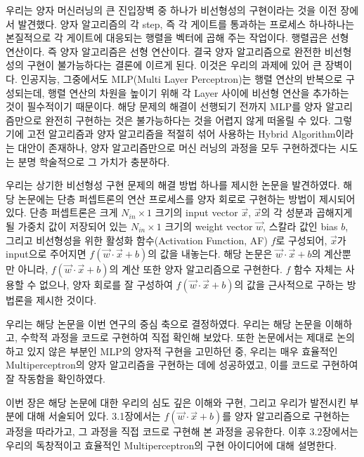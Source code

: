 우리는 양자 머신러닝의 큰 진입장벽 중 하나가 비선형성의 구현이라는 것을 이전 장에서 발견했다.
양자 알고리즘의 각 step, 즉 각 게이트를 통과하는 프로세스 하나하나는 본질적으로 각 게이트에 대응되는 행렬을 벡터에 곱해 주는 작업이다.
행렬곱은 선형 연산이다. 즉 양자 알고리즘은 선형 연산이다. 결국 양자 알고리즘으로 완전한 비선형성의 구현이 불가능하다는 결론에 이르게 된다. 이것은 우리의 과제에 있어 큰 장벽이다.
인공지능, 그중에서도 MLP(Multi Layer Perceptron)는 행렬 연산의 반복으로 구성되는데, 행렬 연산의 차원을 높이기 위해 각 Layer 사이에 비선형 연산을 추가하는 것이 필수적이기 때문이다.
해당 문제의 해결이 선행되기 전까지 MLP를 양자 알고리즘만으로 완전히 구현하는 것은 불가능하다는 것을 어렵지 않게 떠올릴 수 있다.
그렇기에 고전 알고리즘과 양자 알고리즘을 적절히 섞어 사용하는 Hybrid Algorithm이라는 대안이 존재하나, 양자 알고리즘만으로 머신 러닝의 과정을 모두 구현하겠다는 시도는 분명 학술적으로 그 가치가 충분하다.

우리는 상기한 비선형성 구현 문제의 해결 방법 하나를 제시한 논문을 발견하였다.
해당 논문에는 단층 퍼셉트론의 연산 프로세스를 양자 회로로 구현하는 방법이 제시되어 있다.
단층 퍼셉트론은 크게 \(N_{in} \times 1\) 크기의 input vector \(\vec{x}\),
\(\vec{x}\)의 각 성분과 곱해지게 될 가중치 값이 저장되어 있는 \(N_{in} \times 1\) 크기의 weight vector \(\vec{w}\),
스칼라 값인 bias \(b\), 그리고 비선형성을 위한 활성화 함수(Activation Function, AF) \(f\)로 구성되어,
\(\vec{x}\)가 input으로 주어지면 \(f(\vec{w}\cdot\vec{x}+b)\)의 값을 내놓는다.
해당 논문은 \(\vec{w}\cdot\vec{x}+b\)의 계산뿐만 아니라, \(f(\vec{w}\cdot\vec{x}+b)\)의 계산 또한 양자 알고리즘으로 구현한다.
\(f\) 함수 자체는 사용할 수 없으나, 양자 회로를 잘 구성하여 \(f(\vec{w}\cdot\vec{x}+b)\)의 값을 근사적으로 구하는 방법론을 제시한 것이다.

우리는 해당 논문을 이번 연구의 중심 축으로 결정하였다.
우리는 해당 논문을 이해하고, 수학적 과정을 코드로 구현하여 직접 확인해 보았다.
또한 논문에서는 제대로 논의하고 있지 않은 부분인 MLP의 양자적 구현을 고민하던 중, 우리는 매우 효율적인 Multiperceptron의 양자 알고리즘을 구현하는 데에 성공하였고, 이를 코드로 구현하여 잘 작동함을 확인하였다.

이번 장은 해당 논문에 대한 우리의 심도 깊은 이해와 구현, 그리고 우리가 발전시킨 부분에 대해 서술되어 있다.
3.1장에서는 \(f(\vec{w}\cdot\vec{x}+b)\)를 양자 알고리즘으로 구현하는 과정을 따라가고, 그 과정을 직접 코드로 구현해 본 과정을 공유한다.
이후 3.2장에서는 우리의 독창적이고 효율적인 Multiperceptron의 구현 아이디어에 대해 설명한다.

